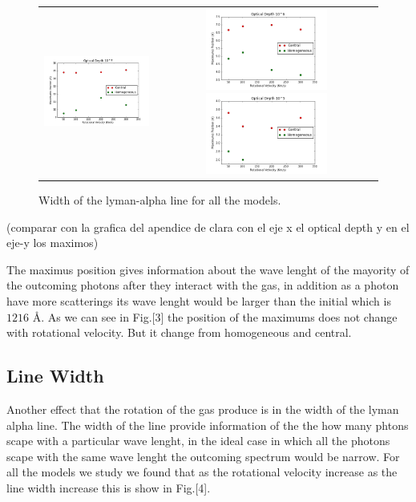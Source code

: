 \documentclass{article}
\theoremstyle{definition}
\theoremstyle{remark}
\begin{document}
\begin{figure}[H]

  \centering

  \label{figur}\caption{Width of the lyman-alpha line for all the models. }

  \begin{tabular}{cc}

    
    \includegraphics[width=40mm]{0maximum7t.png}&

    \includegraphics[width=40mm]{0maximum6t.png}

    \includegraphics[width=40mm]{0maximum5t.png}

   \end{tabular}

\end{figure}
(comparar con la grafica del apendice de clara con el eje x el optical depth y en el eje-y los maximos)

The maximus position gives information about the wave lenght of the mayority of the outcoming photons after they interact with the gas, in addition as a photon have more scatterings its wave lenght would be larger than the initial which is $1216$ {\AA}.
As we can see in Fig.[3] the position of the maximums does not change with rotational velocity. But it change from homogeneous and central. 

\subsection*{Line Width}

Another effect that the rotation of the gas produce is in the  width
of the lyman alpha line. The width of the line provide information of
the the how many phtons scape with a particular wave lenght, in the
ideal case in which all the photons scape with the same wave lenght
the outcoming spectrum would be narrow. For all the models we study we
found that as the rotational velocity increase as the line width
increase this is show in Fig.[4].\\ 
 
\end{document}
